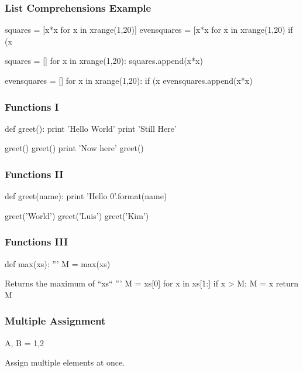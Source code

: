 \begin{frame}[fragile]
\frametitle{List Comprehensions Example}

\begin{python}
squares = [x*x for x in xrange(1,20)]
evensquares = [x*x for x in xrange(1,20) if (x%
\end{python}

\begin{python}
squares = []
for x in xrange(1,20):
    squares.append(x*x)

evensquares = []
for x in xrange(1,20):
    if (x%
        evensquares.append(x*x)
\end{python}

\end{frame}

\begin{frame}[fragile]
\frametitle{Functions I}

\begin{python}
def greet():
    print 'Hello World'
    print 'Still Here'

greet()
greet()
print 'Now here'
greet()
\end{python}
\end{frame}

\begin{frame}[fragile]
\frametitle{Functions II}

\begin{python}
def greet(name):
    print 'Hello {0}'.format(name)

greet('World')
greet('Luis')
greet('Kim')
\end{python}
\end{frame}

\begin{frame}[fragile]
\frametitle{Functions III}

\begin{python}
def max(xs):
    '''
    M = max(xs)

    Returns the maximum of ``xs``
    '''
    M = xs[0]
    for x in xs[1:]
        if x > M:
            M = x
    return M
\end{python}

\end{frame}


\begin{frame}[fragile]
\frametitle{Multiple Assignment}

\begin{python}
A, B = 1,2
\end{python}

Assign multiple elements at once.
\end{frame}

